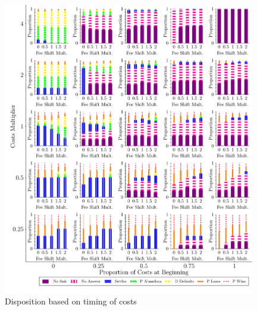 \documentclass{article}
\begin{document}
\begin{figure}
    \centering
    \begin{minipage}{0.48\textwidth}
        \centering
        \includegraphics[width=0.98\textwidth, scale=0.70, trim={0in 0in 0in 0in}, clip]{../Figures/Disposition Varying Proportion of Costs at Beginning} %
        \caption{Disposition based on timing of costs}
		\label{fig:dispositions_timing}
    \end{minipage}\hfill
    \begin{minipage}{0.48\textwidth}
        \centering

\end{minipage}
\end{figure}
\end{document}
